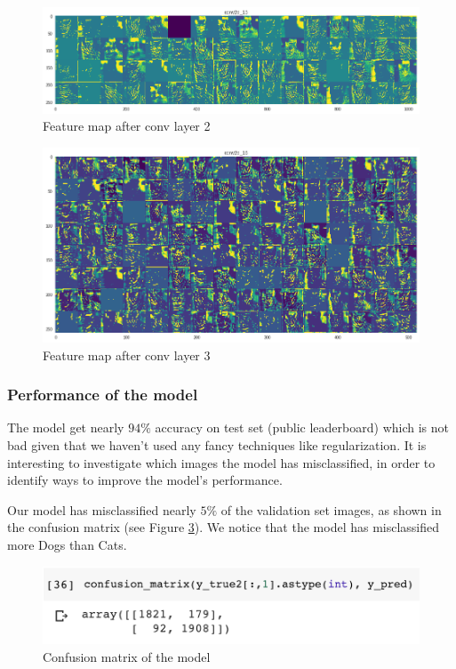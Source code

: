 \documentclass[a4paper]{article}
\begin{document}
\begin{figure}[h!]
	\centering
	\includegraphics[scale=.3]{fp2.png}
	\caption{Feature map after conv layer 2}
	\label{fig:fp2}
\end{figure}

\begin{figure}[h!]
	\centering
	\includegraphics[scale=.3]{fp3.png}
	\caption{Feature map after conv layer 3}
	\label{fig:fp3}
\end{figure}

\subsubsection{Performance of the model}
The model get nearly $94\%$ accuracy on test set (public leaderboard) which is not bad given that we haven't used any fancy techniques like regularization. It is interesting to investigate which images the model has misclassified, in order to identify ways to improve the model's performance. 

Our model has misclassified nearly $5\%$ of the validation set images, as shown in the confusion matrix (see Figure \ref{fig:confusion}). We notice that the model has misclassified more Dogs than Cats.

\begin{figure}[h!]
	\centering
	\includegraphics[scale=.5]{confusion.png}
	\caption{Confusion matrix of the model}
	\label{fig:confusion}
\end{figure}
\end{document}
